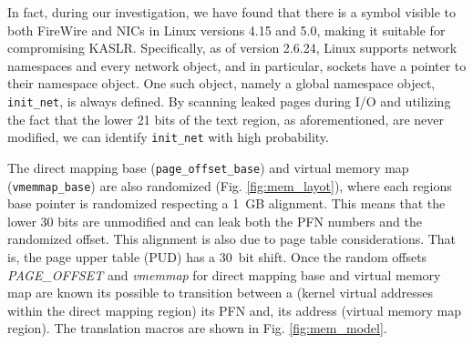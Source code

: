 In fact, during our investigation, we have found that there is a symbol visible to both FireWire and NICs in Linux versions 4.15 and 5.0, making it suitable for compromising KASLR. Specifically, as of version 2.6.24, Linux supports network namespaces and every network object, and in particular, sockets have a pointer to their namespace object. One such object, namely a global namespace object, \texttt{init\_net}, is always defined. By scanning leaked pages during I/O and utilizing the fact that the lower 21 bits of the text region, as aforementioned, are never modified, we can identify \texttt{init\_net} with high probability.

The direct mapping base (\texttt{page\_offset\_base}) and virtual memory map (\texttt{vmemmap\_base}) are also randomized (Fig. \ref{fig:mem_layot}), where each regions base pointer is randomized respecting a 1~GB alignment. This means that the lower 30 bits are unmodified and can leak both the PFN numbers and the randomized offset. This alignment is also due to page table considerations. That is, the page upper table (PUD) has a 30~bit shift. Once the random offsets \textit{PAGE\_OFFSET} and \textit{vmemmap} for direct mapping base and virtual memory map are known its possible to transition between a \kva{} (kernel virtual addresses within the direct mapping region) its PFN and, its \page{} address (virtual memory map region). The translation macros are shown in Fig. \ref{fig:mem_model}. 

